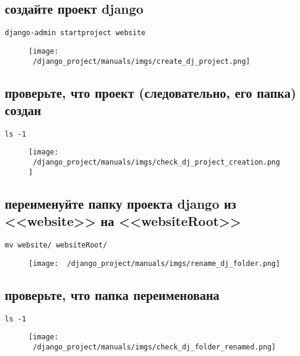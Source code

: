 \documentclass[12pt]{article}
\begin{document}
\subsection{создайте проект django}
      \begin{lstlisting}[caption=\phantom{},style=conlst,label={lst:enter_desktop}]
      django-admin startproject website
			\end{lstlisting}
	\begin{figure}[H]
		\centering
		\texttt{[image: ~/django\_project/manuals/imgs/create\_dj\_project.png]}
		\caption{}
	\end{figure}
\subsection{проверьте, что проект (следовательно, его папка) создан}
      \begin{lstlisting}[caption=\phantom{},style=conlst,label={lst:enter_desktop}]
      ls -1
			\end{lstlisting}
	\begin{figure}[H]
		\centering
		\texttt{[image: ~/django\_project/manuals/imgs/check\_dj\_project\_creation.png]}
		\caption{}
	\end{figure}

\subsection{переименуйте папку проекта django из <<website>> на <<websiteRoot>>}
      \begin{lstlisting}[caption=\phantom{},style=conlst,label={lst:enter_desktop}]
      mv website/ websiteRoot/
			\end{lstlisting}
	\begin{figure}[H]
		\centering
		\texttt{[image: ~/django\_project/manuals/imgs/rename\_dj\_folder.png]}
		\caption{}
	\end{figure}
\subsection{проверьте, что папка переименована}
      \begin{lstlisting}[caption=\phantom{},style=conlst,label={lst:enter_desktop}]
      ls -1
			\end{lstlisting}
	\begin{figure}[H]
		\centering
		\texttt{[image: ~/django\_project/manuals/imgs/check\_dj\_folder\_renamed.png]}
		\caption{}
	\end{figure}
\end{document}
